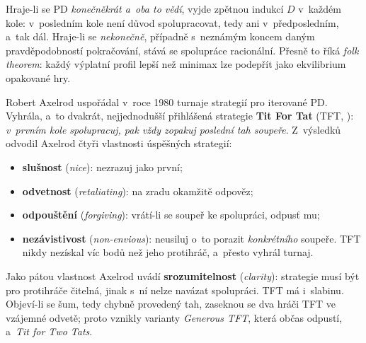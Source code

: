 \documentclass[11pt,a4paper]{article}
\theoremstyle{definition}
\begin{document}
\begin{defbox}
Hraje-li se PD \emph{konečněkrát a~oba to vědí}, vyjde zpětnou indukcí $D$ v~každém kole:
v~posledním kole není důvod spolupracovat, tedy ani v~předposledním, a~tak dál. Hraje-li se
\emph{nekonečně}, případně s~neznámým koncem daným pravděpodobností pokračování, stává se
spolupráce racionální. Přesně to říká \emph{folk theorem}: každý výplatní profil lepší než
minimax lze podepřít jako ekvilibrium opakované hry.

Robert Axelrod uspořádal v~roce 1980 turnaje strategií pro iterované PD. Vyhrála, a~to dvakrát,
nejjednodušší přihlášená strategie \textbf{Tit For Tat} (TFT, ):
\emph{v~prvním kole spolupracuj, pak vždy zopakuj poslední tah soupeře}. Z~výsledků odvodil
Axelrod čtyři vlastnosti úspěšných strategií:
\begin{itemize}
\item \textbf{slušnost} (\emph{nice}): nezrazuj jako první;
\item \textbf{odvetnost} (\emph{retaliating}): na zradu okamžitě odpověz;
\item \textbf{odpouštění} (\emph{forgiving}): vrátí-li se soupeř ke spolupráci, odpusť mu;
\item \textbf{nezávistivost} (\emph{non-envious}): neusiluj o~to porazit \emph{konkrétního}
  soupeře. TFT nikdy nezískal víc bodů než jeho protihráč, a~přesto vyhrál turnaj.
\end{itemize}
Jako pátou vlastnost Axelrod uvádí \textbf{srozumitelnost} (\emph{clarity}): strategie musí být
pro protihráče čitelná, jinak s~ní nelze navázat spolupráci. TFT má i~slabinu. Objeví-li se šum,
tedy chybně provedený tah, zaseknou se dva hráči TFT ve vzájemné odvetě; proto vznikly varianty
\emph{Generous TFT}, která občas odpustí, a~\emph{Tit for Two Tats}.
\end{defbox}
\end{document}
